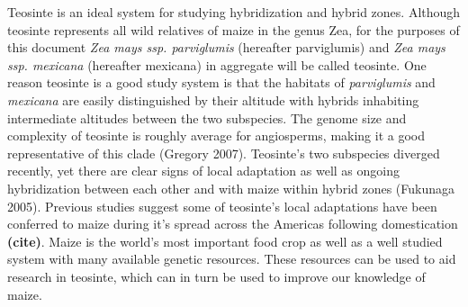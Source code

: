 \documentclass[12pt]{amsart}
\newcommand{\mbh}[1]{\textcolor{red}{ \emph{\scriptsize  #1}} }
\begin{document}
Teosinte is an ideal system for studying hybridization and hybrid zones.  
Although teosinte represents all wild relatives of maize in the genus {Zea}, for the purposes of this document \textit{Zea mays ssp. parviglumis} (hereafter parviglumis) and \textit{Zea mays ssp. mexicana} (hereafter mexicana) in aggregate will be called teosinte. 
One reason teosinte is a good study system is that the habitats of \textit{parviglumis} and \textit{mexicana} are easily distinguished by their altitude with hybrids inhabiting intermediate altitudes between the two subspecies.
The genome size and complexity of teosinte is roughly average for angiosperms, making it a good representative of this clade (Gregory 2007). 
Teosinte's two subspecies diverged recently, yet there are clear signs of local adaptation as well as ongoing hybridization between each other and with maize within hybrid zones (Fukunaga 2005).
Previous studies suggest some of teosinte's local adaptations have been conferred to maize during it's spread across the Americas following domestication \textbf{(cite)}.
Maize is the world's most important food crop as well as a well studied system with many available genetic resources.
These resources can be used to aid research in teosinte, which can in turn be used to improve our knowledge of maize.
\end{document}
